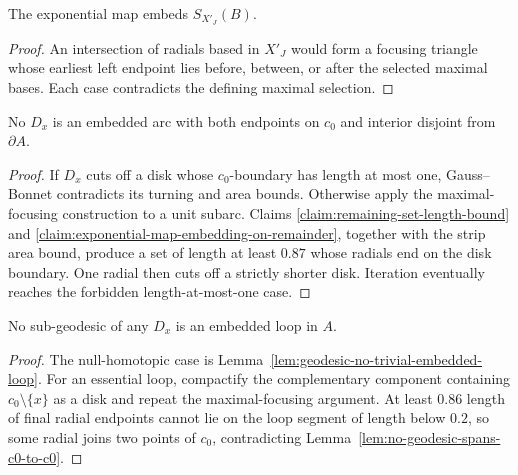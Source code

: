 \begin{claim}
\label{claim:exponential-map-embedding-on-remainder}
The exponential map embeds $S_{X'_J}(B)$.
\end{claim}
\begin{proof}
\sketch An intersection of radials based in $X'_J$ would form a focusing
triangle whose earliest left endpoint lies before, between, or after the
selected maximal bases. Each case contradicts the defining maximal selection.
\end{proof}

\begin{lemma}
\label{lem:no-geodesic-spans-c0-to-c0}
\label{Dxacross}
No $D_x$ is an embedded arc with both endpoints on $c_0$ and interior disjoint
from $\partial A$.
\end{lemma}
\begin{proof}
\sketch If $D_x$ cuts off a disk whose $c_0$-boundary has length at most one,
Gauss--Bonnet contradicts its turning and area bounds. Otherwise apply the
maximal-focusing construction to a unit subarc. Claims
\ref{claim:remaining-set-length-bound} and
\ref{claim:exponential-map-embedding-on-remainder}, together with the strip
area bound, produce a set of length at least $0.87$ whose radials end on the
disk boundary. One radial then cuts off a strictly shorter disk. Iteration
eventually reaches the forbidden length-at-most-one case.
\end{proof}

\begin{lemma}
\label{lem:geodesic-no-embedded-loop-general}
No sub-geodesic of any $D_x$ is an embedded loop in $A$.
\end{lemma}
\begin{proof}
\sketch The null-homotopic case is
Lemma~\ref{lem:geodesic-no-trivial-embedded-loop}. For an essential loop,
compactify the complementary component containing $c_0\setminus\{x\}$ as a
disk and repeat the maximal-focusing argument. At least $0.86$ length of final
radial endpoints cannot lie on the loop segment of length below $0.2$, so some
radial joins two points of $c_0$, contradicting
Lemma~\ref{lem:no-geodesic-spans-c0-to-c0}.
\end{proof}

